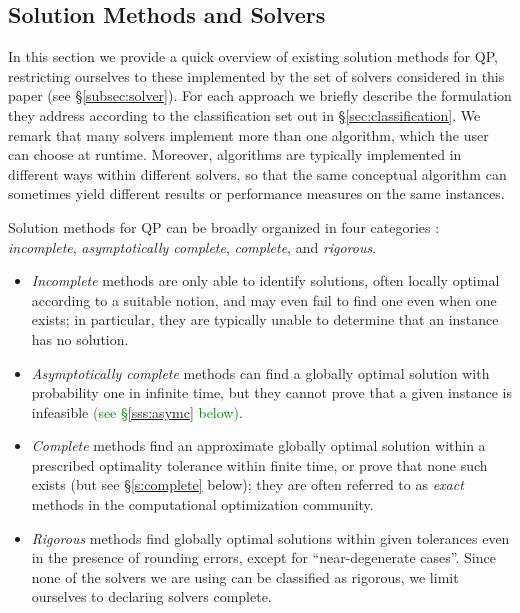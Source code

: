 
\subsection{Solution Methods and Solvers}\label{sec:algo}

In this section we provide a quick overview of existing solution methods for QP, restricting ourselves to these implemented by the set of solvers considered in this paper (see \S\ref{subsec:solver}). For each approach we briefly describe  the formulation they address according to the classification set out in \S\ref{sec:classification}. We remark that many solvers implement more than one algorithm, which the user can choose at runtime. Moreover, algorithms are typically implemented in different ways within different solvers, so that the same conceptual algorithm can sometimes yield different results or performance measures on the same instances.

  Solution methods for QP can be broadly organized in four categories \cite{neumaier}: \emph{incomplete}, \emph{asymptotically complete}, \emph{complete}, and \emph{rigorous}.
  \begin{itemize}
  \item \textit{Incomplete} methods are only able to identify solutions, often locally optimal according to a suitable notion, and may even fail to find one even when one exists; in particular, they are typically unable to determine that an instance has no solution.
  \item \textit{Asymptotically complete} methods can find a globally optimal solution with probability one in infinite time, but  they cannot prove that a given instance is infeasible \textcolor{green}{(see \S\ref{sss:asymc} below)}.
  \item \textit{Complete} methods find an approximate globally optimal solution within a prescribed optimality tolerance within finite time, or prove that none such exists (but see \S\ref{s:complete} below); they are often referred to as \emph{exact} methods in the computational optimization community.
  \item \textit{Rigorous} methods find globally optimal solutions within given tolerances even in the presence of rounding errors, except for ``near-degenerate cases''. Since none of the solvers we are using can be classified as rigorous, we limit ourselves to declaring solvers complete.
  \end{itemize}

